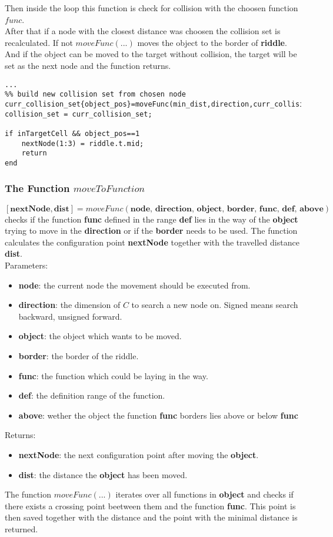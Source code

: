 Then inside the loop this function is check for collision with the choosen function $func$.\\
After that if a node with the closest distance was choosen the collision set is recalculated. If not $moveFunc(...)$ moves the object to the border of \textbf{riddle}.
And if the object can be moved to the target without collision, the target will be set as the next node and the function returns.
\begin{lstlisting}
...
%% build new collision set from chosen node
curr_collision_set{object_pos}=moveFunc(min_dist,direction,curr_collision_set{object_pos});
collision_set = curr_collision_set;

if inTargetCell && object_pos==1
    nextNode(1:3) = riddle.t.mid;
    return
end
\end{lstlisting}

\subsubsection{The Function $moveToFunction$}
$[\textbf{nextNode},\textbf{dist}]=moveFunc(\textbf{node, direction, object, border, func, def, above})$ checks if the function \textbf{func} defined in the range \textbf{def} lies in the way of the \textbf{object} trying to move in the \textbf{direction} or if the \textbf{border} needs to be used. The function calculates the configuration point \textbf{nextNode} together with the travelled distance \textbf{dist}.\\
Parameters:
\begin{itemize}
\item \textbf{node}: the current node the movement should be executed from.
\item \textbf{direction}: the dimension of $C$ to search a new node on. Signed means search backward, unsigned forward. 
\item \textbf{object}: the object which wants to be moved.
\item \textbf{border}: the border of the riddle.
\item \textbf{func}: the function which could be laying in the way.
\item \textbf{def}: the definition range of the function.
\item \textbf{above}: wether the object the function \textbf{func} borders lies above or below \textbf{func}
\end{itemize}
Returns:
\begin{itemize}
\item \textbf{nextNode}: the next configuration point after moving the \textbf{object}.
\item \textbf{dist}: the distance the \textbf{object} has been moved.
\end{itemize}
The function $moveFunc(...)$ iterates over all functions in \textbf{object} and checks if there exists a crossing point beetween them and the function \textbf{func}.
This point is then saved together with the distance and the point with the minimal distance is returned.\\
